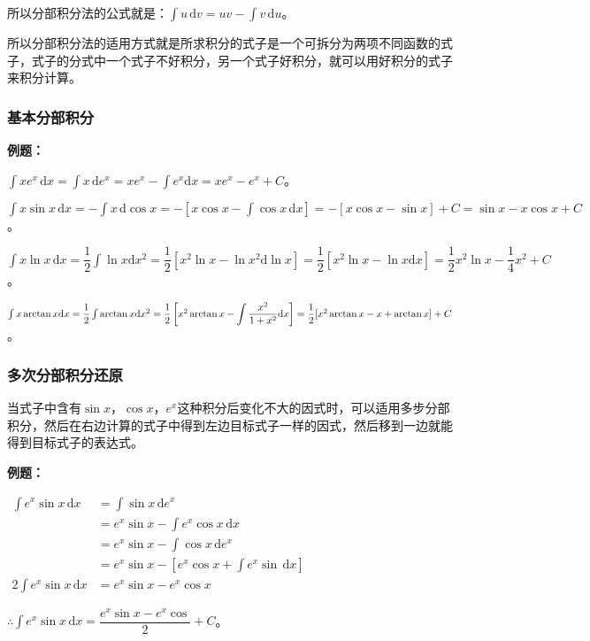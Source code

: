 \documentclass[UTF8, 12pt]{ctexart}
\begin{document}
所以分部积分法的公式就是：$\int u\,\textrm{d}v=uv-\int v\,\textrm{d}u$。

所以分部积分法的适用方式就是所求积分的式子是一个可拆分为两项不同函数的式子，式子的分式中一个式子不好积分，另一个式子好积分，就可以用好积分的式子来积分计算。

\subsubsection{基本分部积分}

\textbf{例题：}

$\int xe^x\,\textrm{d}x=\int x\,\textrm{d}e^x=xe^x-\int e^x\textrm{d}x=xe^x-e^x+C$。

$\int x\sin x\,\textrm{d}x=-\int x\,\textrm{d}\cos x=-[x\cos x-\int\cos x\,\textrm{d}x]=-[x\cos x-\sin x]+C=\sin x-x\cos x+C$。

$\int x\ln x\,\textrm{d}x=\dfrac{1}{2}\int\ln x\textrm{d}x^2=\dfrac{1}{2}[x^2\ln x-\ln x^2\textrm{d}\ln x]=\dfrac{1}{2}[x^2\ln x-\ln x\textrm{d}x]=\dfrac{1}{2}x^2\ln x-\dfrac{1}{4}x^2+C$。

$\int x\arctan x\textrm{d}x=\dfrac{1}{2}\int\arctan x\textrm{d}x^2=\dfrac{1}{2}\left[x^2\arctan x-\displaystyle{\int\dfrac{x^2}{1+x^2}\textrm{d}x}\right]=\\ \dfrac{1}{2}[x^2\arctan x-x+\arctan x]+C$。

\subsubsection{多次分部积分还原}

当式子中含有$\sin x$，$\cos x$，$e^x$这种积分后变化不大的因式时，可以适用多步分部积分，然后在右边计算的式子中得到左边目标式子一样的因式，然后移到一边就能得到目标式子的表达式。

\textbf{例题：}\medskip

$
\begin{aligned}
    \int e^x\sin x\,\textrm{d}x & =\int\sin x\,\textrm{d}e^x \\
    & =e^x\sin x-\int e^x\cos x\,\textrm{d}x \\
    & =e^x\sin x-\int\cos x\,\textrm{d}e^x \\
    & =e^x\sin x-\left[e^x\cos x+\int e^x\sin\,\textrm{d}x\right] \\
    2\int e^x\sin x\,\textrm{d}x & =e^x\sin x-e^x\cos x
\end{aligned}
$

$\therefore\int e^x\sin x\,\textrm{d}x=\dfrac{e^x\sin x-e^x\cos}{2}+C$。
\end{document}
